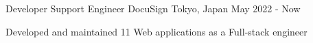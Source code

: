 

\begin{cventries}

  \cventry
    {Developer Support Engineer} %
    {DocuSign} %
    {Tokyo, Japan} %
    {May 2022 - Now} %
    {
      \begin{cvitems} %
        \item {Developed and maintained 11 Web applications as a Full-stack engineer}
      \end{cvitems}
    }


\end{cventries}
